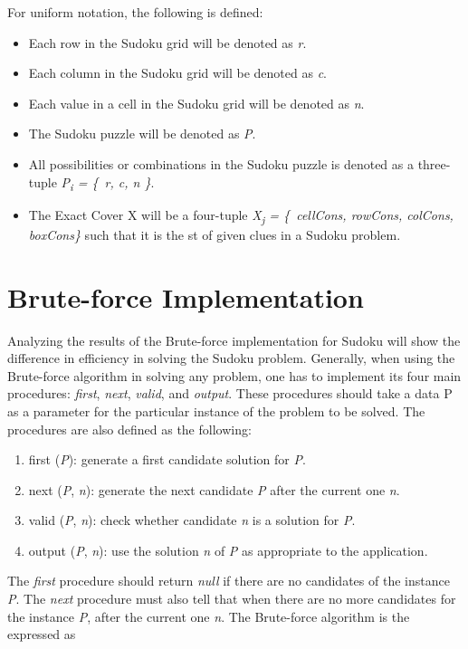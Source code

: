 \documentclass[a4paper,oneside,11pt]{report}
\begin{document}
For uniform notation, the following is defined:
\begin{itemize}
\item Each row in the Sudoku grid will be denoted as \textit{r}.
\item Each column in the Sudoku grid will be denoted as \textit{c}.
\item Each value in a cell in the Sudoku grid will be denoted as \textit{n}.
\item The Sudoku puzzle will be denoted as \textit{P}.
\item All possibilities or combinations in the Sudoku puzzle is denoted as a three-tuple {\itshape P\textsubscript{i} = \{\ r, c, n \}}.
\item The Exact Cover X will be a four-tuple {\itshape X\textsubscript{j} = \{\ cellCons, rowCons, colCons, boxCons\}} such that it is the st of given clues in a Sudoku problem.
\end{itemize}

\section{Brute-force Implementation}
Analyzing the results of the Brute-force implementation for Sudoku will show the difference in efficiency in solving the Sudoku problem. Generally, when using the Brute-force algorithm in solving any problem, one has to implement its four main procedures: \emph{first}, \emph{next}, \emph{valid}, and \emph{output}. These procedures should take a data P as a parameter for the particular instance of the problem to be solved. The procedures are also defined as the following:
\begin{enumerate}
\item first (\emph{P}): generate a first candidate solution for \emph{P}.
\item next (\emph{P}, \emph{n}): generate the next candidate \emph{P} after the current one \emph{n}.
\item valid (\emph{P}, \emph{n}): check whether candidate \emph{n} is a solution for \emph{P}.
\item output (\emph{P}, \emph{n}): use the solution \emph{n} of \emph{P} as appropriate to the application.
\end{enumerate}
The \emph{first} procedure should return \emph{null} if there are no candidates of the instance \emph{P}. The \emph{next} procedure must also tell that when there are no more candidates for the instance \emph{P}, after the current one \emph{n}. The Brute-force algorithm is the expressed as\\
\end{document}
